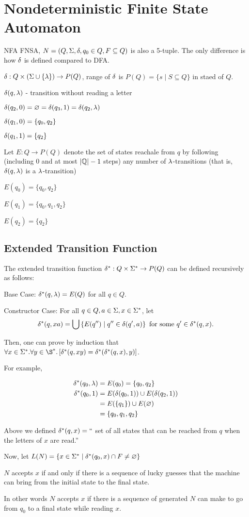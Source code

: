 \documentclass[11pt, cyan, night, 0.5in]{hw}
\begin{document}


\section{Nondeterministic Finite State Automaton}

NFA FNSA, $N=(Q, \Sigma, \delta, q_0\in Q, F\subseteq Q)$ is also a 5-tuple. The only difference is how $\delta$ is defined compared to DFA.

$\delta:Q\times \left(\Sigma\cup\{\lambda\}\right)\to P(Q)$, range of $\delta$ is $P(Q)=\{s\mid S\subseteq Q\}$ in staed of $Q$.

$\delta(q,\lambda)$ - transition without reading a letter


$\delta(q_2,0)=\varnothing=\delta(q_3,1)=\delta(q_2,\lambda)$

$\delta(q_1,0)=\{q_0,q_2\}$

$\delta(q_1,1)=\{q_2\}$

Let $E: Q\to P(Q)$ denote the set of states reachale from $q$ by following (including 0 and at most $|\mathbb{Q}|-1$ steps) any number of $\lambda$-transitions (that is, $\delta(q,\lambda)$ is a $\lambda$-transition)

$E(q_0)=\{q_0,q_2\}$

$E(q_1)=\{q_0,q_1,q_2\}$

$E(q_2)=\{q_2\}$

\subsection{Extended Transition Function}

The extended transition function $\delta^*:Q\times \Sigma^*\to P(Q)$ can be defined recursively as follows:

Base Case: $\delta^*(q, \lambda)=E(Q)$ for all $q\in Q$.

Constructor Case: For all $q\in Q, a\in \Sigma, x\in\Sigma^*$, let \[\delta^*(q,xa)=\bigcup\left\{E(q'')\mid q''\in\delta(q',a)\right\}\text{ for some }q'\in\delta^*(q,x).\]

Then, one can prove by induction that $\forall x\in\Si^*. \forall y\in\S^*. \sqrbra{\de^*(q,xy)=\de^*(\de^*(q,x),y)}$.

For example, 

\begin{align*}
    \delta^*(q_0,\lambda)&=E(q_0) = \{q_0,q_2\}\\
    \delta^*(q_0,1)&=E(\delta(q_0, 1))\cup E(\delta(q_2, 1))\\
    &= E(\{q_1\})\cup E(\varnothing)\\
    &=\{q_0,q_1,q_2\}
\end{align*}

Above we defined $\delta^*(q,x)=``$ set of all states that can be reached from $q$ when the letters of $x$ are read.''

Now, let $L(N)=\{x\in\Sigma^*\mid \delta^*(q_0, x)\cap F\neq \varnothing\}$

$N$ accepts $x$ if and only if there is a sequence of lucky guesses that the machine can bring from the initial state to the final state.

In other words $N$ accepts $x$ if there is a sequence of generated $N$ can make to go from $q_0$ to a final state while reading $x$.
\end{document}
